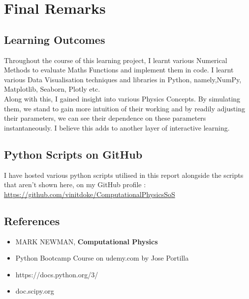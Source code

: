 \section{Final Remarks}
\subsection{Learning Outcomes}
Throughout the course of this learning project, I learnt various Numerical Methods to evaluate Maths Functions and implement them in code. I learnt various Data Visualisation techniques and libraries in Python, namely,NumPy, Matplotlib, Seaborn, Plotly etc. \\
Along with this, I gained insight into various Physics Concepts. By simulating them, we stand to gain more intuition of their working and by readily adjusting their parameters, we can see their dependence on these parameters instantaneously. I believe this adds to another layer of interactive learning. \\

\subsection{Python Scripts on GitHub}
I have hosted various python scripts utilised in this report alongside the scripts that aren't shown here, on my GitHub profile :  \href{https://github.com/vinitdoke/Computational_Physics_SoS_2020}{https://github.com/vinitdoke/Computational\textunderscore Physics\textunderscore SoS}
\subsection{References}
\begin{itemize}
	\item MARK NEWMAN, \textbf{ Computational Physics}
	\item Python Bootcamp Course on udemy.com by Jose Portilla
	\item https://docs.python.org/3/
	
	\item doc.scipy.org
	
	
\end{itemize}
